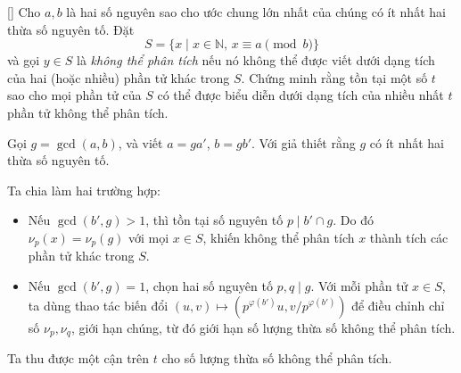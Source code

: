 \documentclass[../06-largest-exponent.tex]{subfiles}
\begin{document}
\begin{example*}\label{example:CHN-2015-TST3-D1-P3}[\textbf{}]
	Cho \( a, b \) là hai số nguyên sao cho ước chung lớn nhất của chúng có ít nhất hai thừa số nguyên tố.  
	Đặt  
	\[
		S = \{ x \mid x \in \mathbb{N},\, x \equiv a \pmod{b} \}
	\]
	và gọi \( y \in S \) là \textit{không thể phân tích} nếu nó không thể được viết
	dưới dạng tích của hai (hoặc nhiều) phần tử khác trong \( S \).  
	Chứng minh rằng tồn tại một số \( t \) sao cho mọi phần tử của \( S \) có thể được biểu diễn
	dưới dạng tích của nhiều nhất \( t \) phần tử không thể phân tích.
\end{example*}

\begin{story*}
	Gọi \(g=\gcd(a,b)\), và viết \(a = ga'\), \(b = gb'\). Với giả thiết rằng \(g\) có ít nhất hai thừa số nguyên tố.

	Ta chia làm hai trường hợp:
	\begin{itemize}[topsep=0pt, partopsep=0pt, itemsep=0pt]
		\item Nếu \( \gcd(b', g) > 1 \), thì tồn tại số nguyên tố \( p \mid b' \cap g \). Do đó \( \nu_p(x) = \nu_p(g) \) với mọi \( x \in S \), khiến không thể phân tích \( x \) thành tích các phần tử khác trong \( S \).
		\item Nếu \( \gcd(b', g) = 1 \), chọn hai số nguyên tố \( p, q \mid g \). Với mỗi phần tử \( x \in S \), ta dùng thao tác biến đổi \( (u, v) \mapsto (p^{\varphi(b')}u, v/p^{\varphi(b')}) \) để điều chỉnh chỉ số \( \nu_p, \nu_q \), giới hạn chúng, từ đó giới hạn số lượng thừa số không thể phân tích.
	\end{itemize}
	Ta thu được một cận trên \( t \) cho số lượng thừa số không thể phân tích.
\end{story*}

\bigbreak
\end{document}
